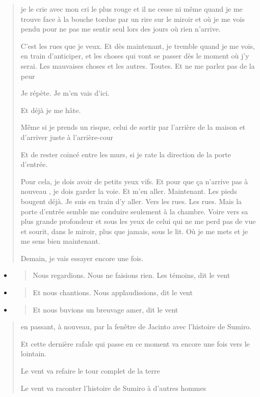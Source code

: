 \begin{quote}
je le crie avec mon cri le plus rouge et il ne cesse ni même quand je me
trouve face à la bouche tordue par un rire sur le miroir et où je me
vois pendu pour ne pas me sentir seul lors des jours où rien n'arrive.

C'est les rues que je veux. Et dès maintenant, je tremble quand je me
vois, en train d'anticiper, et les choses qui vont se passer dès le
moment où j'y serai. Les mauvaises choses et les autres. Toutes. Et ne
me parlez pas de la peur

Je répète. Je m'en vais d'ici.

Et déjà je me hâte.

Même si je prends un risque, celui de sortir par l'arrière de la maison
et d'arriver juste à l'arrière-cour

Et de rester coincé entre les murs, si je rate la direction de la porte
d'entrée.

Pour cela, je dois avoir de petits yeux vifs. Et pour que ça n'arrive
pas à nouveau , je dois garder la voie. Et m'en aller. Maintenant. Les
pieds bougent déjà. Je suis en train d'y aller. Vers les rues. Les rues.
Mais la porte d'entrée semble me conduire seulement à la chambre. Voire
vers sa plus grande profondeur et sous les yeux de celui qui ne me perd
pas de vue et sourit, dans le miroir, plus que jamais, sous le lit. Où
je me mets et je me sens bien maintenant.

Demain, je vais essayer encore une fois.
\end{quote}

\begin{itemize}
\item
  \begin{quote}
  Nous regardions. Nous ne faisions rien. Les témoins, dit le vent
  \end{quote}
\item
  \begin{quote}
  Et nous chantions. Nous applaudissions, dit le vent
  \end{quote}
\item
  \begin{quote}
  Et nous buvions un breuvage amer, dit le vent
  \end{quote}
\end{itemize}

\begin{quote}
en passant, à nouveau, par la fenêtre de Jacinto avec l'histoire de
Sumiro.

Et cette dernière rafale qui passe en ce moment va encore une fois vers
le lointain.

Le vent va refaire le tour complet de la terre

Le vent va raconter l'histoire de Sumiro à d'autres hommes
\end{quote}

